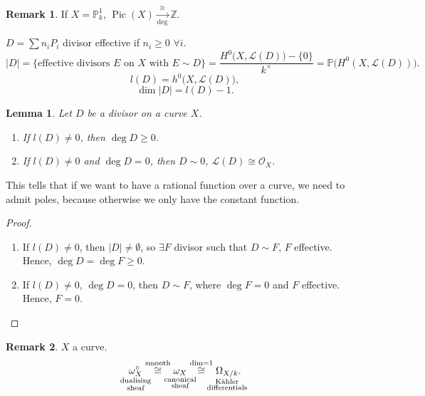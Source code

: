 \documentclass[12pt]{article}
\DeclareMathOperator{\Pic}{Pic}
\newtheorem*{lemma}{Lemma}
\theoremstyle{definition}
\newtheorem*{remark}{Remark}
\begin{document}
\begin{remark}
If $X=\mathbb{P}_k^1$, $\Pic(X)\xrightarrow[\deg]{\cong}\mathbb{Z}$.
\end{remark}

$D=\sum n_iP_i$ divisor effective if $n_i\geq0$ $\forall i$.
\[|D|=\{\text{effective divisors }E\text{ on }X\text{ with }E\sim D\}=\frac{H^0\big(X,\mathcal{L}(D)\big)-\{0\}}{k^{\times}}=\mathbb{P}\big(H^0(X,\mathcal{L}(D))\big).\]
\[l(D)=h^0\big(X,\mathcal{L}(D)\big),\]
\[\dim|D|=l(D)-1.\]

\begin{lemma}
Let $D$ be a divisor on a curve $X$.

\begin{enumerate}[label=\arabic*)]
\item If $l(D)\neq0$, then $\deg D\geq0$.

\item If $l(D)\neq0$ and $\deg D=0$, then $D\sim0$, $\mathcal{L}(D)\cong\mathcal{O}_X$.
\end{enumerate}
\end{lemma}

This tells that if we want to have a rational function over a curve, we need to admit poles, because otherwise we only have the constant function.

\begin{proof}
\begin{enumerate}[label=\arabic*)]
\item If $l(D)\neq0$, then $|D|\neq\emptyset$, so $\exists F$ divisor such that $D\sim F$, $F$ effective. Hence, $\deg D=\deg F\geq0$.

\item If $l(D)\neq0$, $\deg D=0$, then $D\sim F$, where $\deg F=0$ and $F$ effective. Hence, $F=0$.
\end{enumerate}
\end{proof}

\begin{remark}
$X$ a curve.
\[\underset{\mathclap{\substack{\text{dualising}\\\text{sheaf}}}}{\omega_X^{\circ}}\overset{\text{smooth}}{\cong}\underset{\mathclap{\substack{\text{canonical}\\\text{sheaf}}}}{\omega_X}\overset{\dim=1}{\cong}\underset{\mathclap{\substack{\text{K\"{a}hler}\\\text{differentials}}}}{\Omega_{X/k}}.\]
\end{remark}
\end{document}
